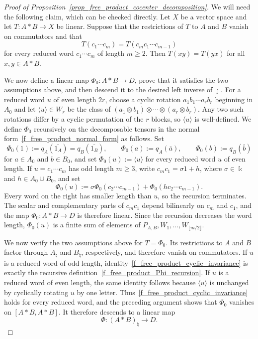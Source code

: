 \begin{proof}[Proof of Proposition~\ref{prop_free_product_cocenter_decomposition}]
    We will need the following claim, which can be checked directly. Let \(X\) be a vector space and let \(T\colon A*B\to X\) be linear.
    Suppose that the restrictions of \(T\) to \(A\) and \(B\) vanish on commutators and that
    \begin{equation}\label{f_free_product_cyclic_invariance}
        T(c_1\cdots c_m)=T(c_m c_1\cdots c_{m-1})
    \end{equation}
    for every reduced word \(c_1\cdots c_m\) of length \(m\geq2\). Then \(T(xy)=T(yx)\) for all \(x,y\in A*B\).

    We now define a linear map \(\Phi_0\colon A*B\to D\), prove that it satisfies the two assumptions above, and then descend it to the desired left inverse of \(\jmath\).
    For a reduced word \(u\) of even length \(2r\), choose a cyclic rotation \(a_1b_1\cdots a_rb_r\) beginning in \(A_0\) and let \(\langle u\rangle\in W_r\) be the class of \((a_1\otimes b_1)\otimes\cdots\otimes(a_r\otimes b_r)\).
    Any two such rotations differ by a cyclic permutation of the \(r\) blocks, so \(\langle u\rangle\) is well-defined.
    We define \(\Phi_0\) recursively on the decomposable tensors in the normal form~\eqref{f_free_product_normal_form} as follows.
    Set
    \[
        \Phi_0(1):=q_A(\overline{1_A})=q_B(\overline{1_B}),
        \qquad
        \Phi_0(a):=q_A(\overline a),
        \qquad
        \Phi_0(b):=q_B(\overline b)
    \]
    for \(a\in A_0\) and \(b\in B_0\), and set \(\Phi_0(u):=\langle u\rangle\) for every reduced word \(u\) of even length.
    If \(u=c_1\cdots c_m\) has odd length \(m\geq3\), write \(c_m c_1=\sigma 1+h\), where \(\sigma\in\Bbbk\) and \(h\in A_0\cup B_0\), and set
    \begin{equation}\label{f_free_product_Phi_recursion}
        \Phi_0(u):=\sigma\Phi_0(c_2\cdots c_{m-1})+\Phi_0(h c_2\cdots c_{m-1}).
    \end{equation}
    Every word on the right has smaller length than \(u\), so the recursion terminates.
    The scalar and complementary parts of \(c_m c_1\) depend bilinearly on \(c_m\) and \(c_1\), and the map \(\Phi_0\colon A*B\to D\) is therefore linear.
    Since the recursion decreases the word length, \(\Phi_0(u)\) is a finite sum of elements of \(P_{A,B},W_1,\ldots,W_{\lfloor m/2\rfloor}\).

    We now verify the two assumptions above for \(T=\Phi_0\).
    Its restrictions to \(A\) and \(B\) factor through \(A_{\natural}\) and \(B_{\natural}\), respectively, and therefore vanish on commutators.
    If \(u\) is a reduced word of odd length, identity~\eqref{f_free_product_cyclic_invariance} is exactly the recursive definition~\eqref{f_free_product_Phi_recursion}.
    If \(u\) is a reduced word of even length, the same identity follows because \(\langle u\rangle\) is unchanged by cyclically rotating \(u\) by one letter.
    Thus~\eqref{f_free_product_cyclic_invariance} holds for every reduced word, and the preceding argument shows that \(\Phi_0\) vanishes on \([A*B,A*B]\).
    It therefore descends to a linear map
    \[
        \Phi\colon(A*B)_{\natural}\longrightarrow D.
    \]


\end{proof}
